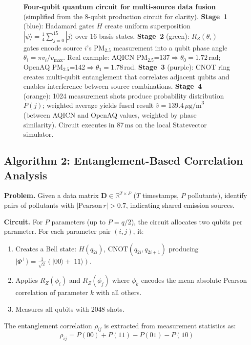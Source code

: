 \documentclass[12pt,a4paper]{article}
\newcommand{\ket}[1]{|#1\rangle}
\begin{document}
\begin{figure}[H]
\begin{tikzpicture}[
  scale=0.95,
  gate/.style={draw, fill=#1!25, minimum width=0.7cm, minimum height=0.5cm,
               font=\small},
  wire/.style={thick},
  ctrl/.style={circle, fill=black, inner sep=1.5pt}
]
\end{tikzpicture}
\caption[Four-qubit quantum circuit for multi-source data fusion]{%
  \textbf{Four-qubit quantum circuit for multi-source data fusion} (simplified
  from the 8-qubit production circuit for clarity).
  \textbf{Stage~1} (blue): Hadamard gates $H$ create uniform superposition
  $\ket{\psi} = \frac{1}{4}\sum_{j=0}^{15}\ket{j}$ over 16 basis states.
  \textbf{Stage~2} (green): $R_Z(\theta_i)$ gates encode source $i$'s
  PM$_{2.5}$ measurement into a qubit phase angle
  $\theta_i = \pi v_i / v_{\max}$. Real example:
  AQICN PM$_{2.5}$=137$\Rightarrow\theta_0 = 1.72$\,rad;
  OpenAQ PM$_{2.5}$=142$\Rightarrow\theta_1 = 1.78$\,rad.
  \textbf{Stage~3} (purple): CNOT ring creates multi-qubit entanglement that
  correlates adjacent qubits and enables interference between source combinations.
  \textbf{Stage~4} (orange): 1024 measurement shots produce probability
  distribution $P(j)$; weighted average yields fused result
  $\hat{v} = 139.4\,\mu\text{g/m}^3$ (between AQICN and OpenAQ values,
  weighted by phase similarity). Circuit executes in 87\,ms on the local
  Statevector simulator.}
\label{fig:quantumcircuit}
\end{figure}

\subsection{Algorithm 2: Entanglement-Based Correlation Analysis}
\label{sec:quantum:entangle}

\noindent\textbf{Problem.} Given a data matrix
$\mathbf{D} \in \mathbb{R}^{T \times P}$ ($T$ timestamps, $P$ pollutants),
identify pairs of pollutants with $|\text{Pearson}\,r| > 0.7$,
indicating shared emission sources.

\noindent\textbf{Circuit.} For $P$ parameters (up to $P = q/2$), the circuit
allocates two qubits per parameter. For each parameter pair $(i,j)$, it:
\begin{enumerate}
\item Creates a Bell state: $H(q_{2i})$, $\text{CNOT}(q_{2i}, q_{2i+1})$
      producing $\ket{\Phi^+} = \frac{1}{\sqrt{2}}(\ket{00}+\ket{11})$.
\item Applies $R_Z(\phi_i)$ and $R_Z(\phi_j)$ where $\phi_k$ encodes the
      mean absolute Pearson correlation of parameter $k$ with all others.
\item Measures all qubits with 2048 shots.
\end{enumerate}

The entanglement correlation $\rho_{ij}$ is extracted from measurement
statistics as:
\begin{equation}
\rho_{ij} = P(00) + P(11) - P(01) - P(10)
\label{eq:entanglecorr}
\end{equation}
\end{document}
